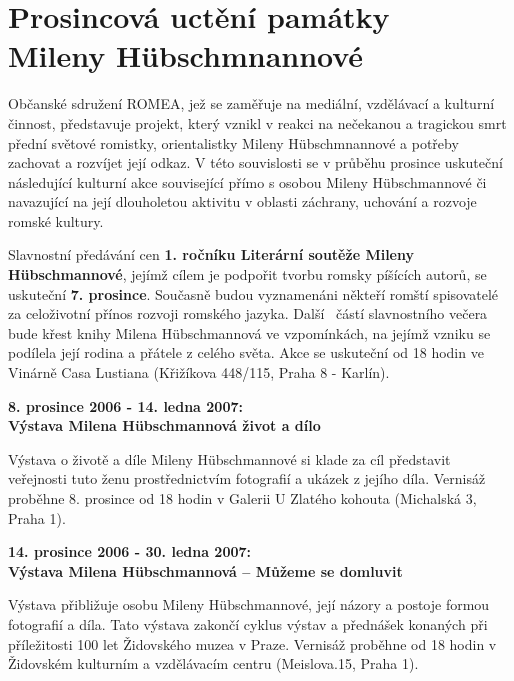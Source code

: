 \section{Prosincová uctění památky \\ Mileny Hübschmnannové}

\noindent
Občanské sdružení ROMEA, jež se zaměřuje na mediální, vzdělávací a kulturní činnost, představuje projekt, který vznikl v reakci na nečekanou a tragickou smrt přední světové romistky, orientalistky Mileny Hübschmnannové a potřeby zachovat a rozvíjet její odkaz. V této souvislosti se v průběhu prosince uskuteční následující kulturní akce související přímo s osobou Mileny Hübschmannové či navazující na její dlouholetou aktivitu v oblasti záchrany, uchování a rozvoje romské kultury.

\bigskip
 
\noindent
Slavnostní předávání cen \textbf{1. ročníku Literární soutěže Mileny Hübschmannové}, jejímž cílem je podpořit tvorbu romsky píšících autorů, se uskuteční \textbf{7. prosince}. Současně budou vyznamenáni někteří romští spisovatelé za celoživotní přínos rozvoji romského jazyka.
Další  částí slavnostního večera bude křest knihy Milena Hübschmannová ve vzpomínkách, na jejímž vzniku se podílela její rodina a přátele z celého světa. Akce se uskuteční od 18 hodin ve Vinárně Casa Lustiana (Křižíkova 448/115, Praha 8 - Karlín).

\bigskip
 
\noindent
\textbf{8. prosince 2006 - 14. ledna 2007: \\ Výstava Milena Hübschmannová život a dílo}

\noindent
Výstava o životě a díle Mileny Hübschmannové si klade za cíl představit veřejnosti tuto ženu prostřednictvím fotografií a ukázek z jejího díla. Vernisáž proběhne 8. prosince od 18 hodin v Galerii U Zlatého kohouta (Michalská 3, Praha 1).

\bigskip
 
\noindent
\textbf{14. prosince 2006 - 30. ledna 2007: \\ Výstava Milena Hübschmannová -- Můžeme se domluvit}

\noindent
Výstava přibližuje osobu Mileny Hübschmannové, její názory a postoje formou fotografií a díla. Tato výstava zakončí cyklus výstav a přednášek konaných při příležitosti 100 let Židovského muzea v Praze. Vernisáž proběhne od 18 hodin v Židovském kulturním a vzdělávacím centru (Meislova.15, Praha 1).

\bigskip
 

